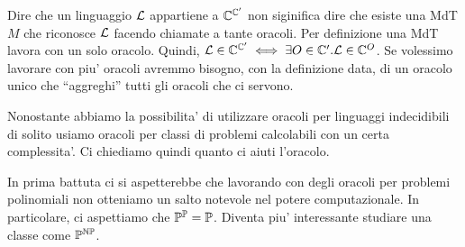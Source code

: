 Dire che un linguaggio $\mathcal{L}$ appartiene a $\mathbb{C}^{\mathbb{C}'}$ non siginifica dire che esiste una
MdT $M$ che riconosce $\mathcal{L}$ facendo chiamate a tante oracoli. Per definizione una MdT lavora con
un solo oracolo. Quindi, $\mathcal{L} \in \mathbb{C}^{\mathbb{C}'} \iff \exists O \in \mathbb{C}'. \mathcal{L} \in
\mathbb{C}^{O}$. Se volessimo lavorare con piu' oracoli avremmo bisogno, con la definizione data, di un
oracolo unico che ``aggreghi'' tutti gli oracoli che ci servono.

Nonostante abbiamo la possibilita' di utilizzare oracoli per linguaggi indecidibili di solito usiamo
oracoli per classi di problemi calcolabili con un certa complessita'. Ci chiediamo quindi quanto ci
aiuti l'oracolo. 

In prima battuta ci si aspetterebbe che lavorando con degli oracoli per problemi polinomiali non
otteniamo un salto notevole nel potere computazionale. In particolare, ci aspettiamo che
$\mathbb{P}^{\mathbb{P}} =
\mathbb{P}$. Diventa piu' interessante studiare una classe come $\mathbb{P}^{\mathbb{NP}}$.

